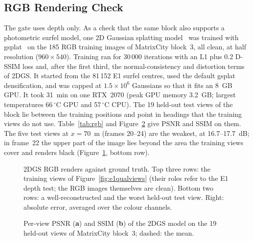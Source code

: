 \subsection{RGB Rendering Check}
\label{sup:rgb}
The gate uses depth only. As a check that the same block also supports a photometric surfel model, one
2D Gaussian splatting model~\citep{gs_2dgs} was trained with gsplat~\citep{gs_gsplat} on the 185 RGB training images of
MatrixCity block~3, all clean, at half resolution ($960\times540$). Training ran for 30\,000 iterations with an
L1 plus 0.2 D-SSIM loss and, after the first third, the normal-consistency and distortion terms of 2DGS. It
started from the 81\,152 E1 surfel centres, used the default gsplat densification, and was capped at
$1.5\times10^{6}$ Gaussians so that it fits an 8~GB GPU. It took 31~min on one RTX~2070 (peak GPU memory
3.2~GB; largest temperatures 66\,$^{\circ}$C GPU and 57\,$^{\circ}$C CPU). The 19 held-out test views of the
block lie between the training positions and point in headings that the training views do not use.
Table~\ref{tab:rgb} and Figure~\ref{fig:rgbtest} give PSNR and SSIM on them. The five test views at
$x=70$~m (frames 20--24) are the weakest, at 16.7--17.7~dB; in frame~22 the upper part of the image
lies beyond the area the training views cover and renders black (Figure~\ref{fig:rgbviews}, bottom row).

\begin{table}[!htbp]
\centering
\caption{2DGS RGB reconstruction of MatrixCity block~3: test-split mean $\pm$ standard deviation over
views, and the three training views of Figure~\ref{fig:e1qualviews}.}
\label{tab:rgb}

\end{table}

\begin{figure}[!htbp]
\centering

\caption{2DGS RGB renders against ground truth. Top three rows: the training views of
Figure~\ref{fig:e1qualviews} (their roles refer to the E1 depth test; the RGB images themselves are clean).
Bottom two rows: a well-reconstructed and the worst held-out test view. Right: absolute error, averaged over
the colour channels.}
\label{fig:rgbviews}
\end{figure}

\begin{figure}[!htbp]
\centering

\caption{Per-view PSNR (\textbf{a}) and SSIM (\textbf{b}) of the 2DGS model on the 19 held-out views of
MatrixCity block~3; dashed: the mean.}
\label{fig:rgbtest}
\end{figure}
\FloatBarrier

